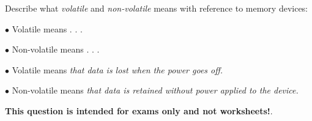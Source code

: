 

Describe what {\it volatile} and {\it non-volatile} means with reference to memory devices:

\medskip
\item{$\bullet$} Volatile means . . .
\vskip 40pt
\item{$\bullet$} Non-volatile means . . .
\medskip







\medskip
\item{$\bullet$} Volatile means {\it that data is lost when the power goes off.}
\vskip 10pt
\item{$\bullet$} Non-volatile means {\it that data is retained without power applied to the device.}
\medskip







{\bf This question is intended for exams only and not worksheets!}.




